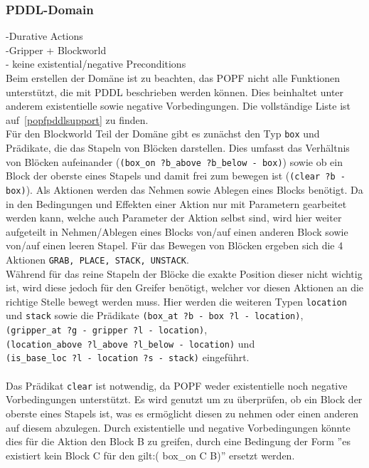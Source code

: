 \subsubsection{PDDL-Domain}
-Durative Actions\\
-Gripper + Blockworld\\
- keine existential/negative Preconditions\\
Beim erstellen der Domäne ist zu beachten, das \ac{POPF} nicht alle Funktionen unterstützt, die mit PDDL beschrieben werden können.
Dies beinhaltet unter anderem existentielle sowie negative Vorbedingungen.
Die vollständige Liste ist auf~\ref{popfpddlsupport} zu finden.\\
Für den Blockworld Teil der Domäne gibt es zunächst den Typ \verb|box| und Prädikate, die das Stapeln von Blöcken darstellen.
Dies umfasst das Verhältnis von Blöcken aufeinander (\verb|(box_on ?b_above ?b_below - box)|) sowie ob ein Block der oberste eines Stapels und damit frei zum bewegen ist (\verb|(clear ?b - box)|).
Als Aktionen werden das Nehmen sowie Ablegen eines Blocks benötigt.
Da in den Bedingungen und Effekten einer Aktion nur mit Parametern gearbeitet werden kann, welche auch Parameter der Aktion selbst sind, wird hier weiter aufgeteilt in Nehmen/Ablegen eines Blocks von/auf einen anderen Block sowie von/auf einen leeren Stapel.
Für das Bewegen von Blöcken ergeben sich die 4 Aktionen \verb|GRAB, PLACE, STACK, UNSTACK|.\\
Während für das reine Stapeln der Blöcke die exakte Position dieser nicht wichtig ist, wird diese jedoch für den Greifer benötigt, welcher vor diesen Aktionen an die richtige Stelle bewegt werden muss.
Hier werden die weiteren Typen \verb|location| und \verb|stack| sowie die Prädikate \verb|(box_at ?b - box ?l - location)|,\\ \verb|(gripper_at ?g - gripper ?l - location)|,\\ \verb|(location_above ?l_above ?l_below - location)| und\\ \verb|(is_base_loc ?l - location ?s - stack)| eingeführt.\\ \\
Das Prädikat \verb|clear| ist notwendig, da \ac{POPF} weder existentielle noch negative Vorbedingungen unterstützt.
Es wird genutzt um zu überprüfen, ob ein Block der oberste eines Stapels ist, was es ermöglicht diesen zu nehmen oder einen anderen auf diesem abzulegen.
Durch existentielle und negative Vorbedingungen könnte dies für die Aktion den Block B zu greifen, durch eine Bedingung der Form ''es existiert kein Block C für den gilt:( box\_on C B)'' ersetzt werden. \\ \\
